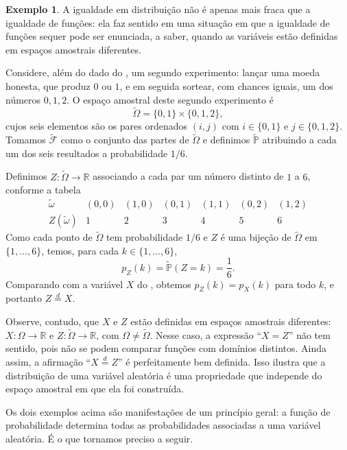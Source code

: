\documentclass[12pt,portuguese]{article}
\theoremstyle{definition}
\newtheorem{example}[example]{Exemplo}
\begin{document}
\begin{example}\label{ex:dado-espaco-diferente}
A igualdade em distribuição não é apenas mais fraca que a igualdade de funções:
ela faz sentido em uma situação em que a igualdade de funções sequer pode ser enunciada,
a saber, quando as variáveis estão definidas em espaços amostrais diferentes.

Considere, além do dado do , um segundo experimento: lançar
uma moeda honesta, que produz $0$ ou $1$, e em seguida sortear, com chances iguais,
um dos números $0, 1, 2$. O espaço amostral deste segundo experimento é
\[
  \widetilde{\Omega} = \{0, 1\} \times \{0, 1, 2\},
\]
cujos seis elementos são os pares ordenados $(i, j)$ com $i \in \{0, 1\}$ e
$j \in \{0, 1, 2\}$. Tomamos $\widetilde{\mathcal{F}}$ como o conjunto das partes de
$\widetilde{\Omega}$ e definimos $\widetilde{\mathbb{P}}$ atribuindo a cada um dos seis
resultados a probabilidade $1/6$.

Definimos $Z : \widetilde{\Omega} \to \mathbb{R}$ associando a cada par um número
distinto de $1$ a $6$, conforme a tabela
\[
  \begin{array}{c|cccccc}
    \widetilde{\omega} & (0,0) & (1,0) & (0,1) & (1,1) & (0,2) & (1,2) \\
    \hline
    Z(\widetilde{\omega}) & 1 & 2 & 3 & 4 & 5 & 6
  \end{array}
\]
Como cada ponto de $\widetilde{\Omega}$ tem probabilidade $1/6$ e $Z$ é uma bijeção de
$\widetilde{\Omega}$ em $\{1, \dots, 6\}$, temos, para cada $k \in \{1, \dots, 6\}$,
\[
  p_Z(k) = \widetilde{\mathbb{P}}(Z = k) = \frac{1}{6}.
\]
Comparando com a variável $X$ do , obtemos
$p_Z(k) = p_X(k)$ para todo $k$, e portanto $Z \overset{d}{=} X$.

Observe, contudo, que $X$ e $Z$ estão definidas em espaços amostrais diferentes:
$X : \Omega \to \mathbb{R}$ e $Z : \widetilde{\Omega} \to \mathbb{R}$, com
$\Omega \neq \widetilde{\Omega}$. Nesse caso, a expressão ``$X = Z$'' não tem sentido,
pois não se podem comparar funções com domínios distintos. Ainda assim, a afirmação
``$X \overset{d}{=} Z$'' é perfeitamente bem definida. Isso ilustra que a distribuição
de uma variável aleatória é uma propriedade que independe do espaço amostral em que
ela foi construída.
\end{example}

Os dois exemplos acima são manifestações de um princípio geral: a função de
probabilidade determina todas as probabilidades associadas a uma variável aleatória.
É o que tornamos preciso a seguir.
\end{document}
